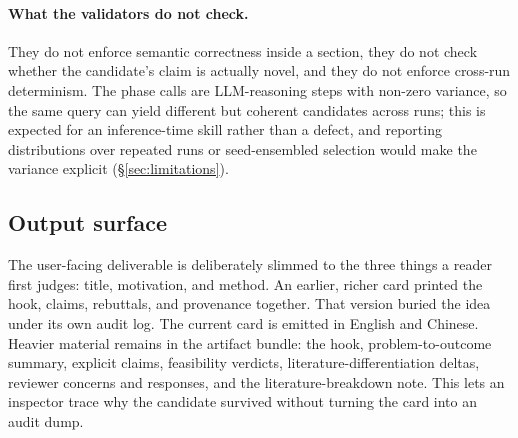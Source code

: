 \documentclass[10pt,a4paper]{article}
\begin{document}
\paragraph{What the validators do not check.} They do not enforce semantic correctness inside a section, they do not check whether the candidate's claim is actually novel, and they do not enforce cross-run determinism. The phase calls are LLM-reasoning steps with non-zero variance, so the same query can yield different but coherent candidates across runs; this is expected for an inference-time skill rather than a defect, and reporting distributions over repeated runs or seed-ensembled selection would make the variance explicit (\S\ref{sec:limitations}).

\subsection{Output surface}
\label{subsec:skill-schema}

The user-facing deliverable is deliberately slimmed to the three things a reader first judges: title, motivation, and method. An earlier, richer card printed the hook, claims, rebuttals, and provenance together. That version buried the idea under its own audit log. The current card is emitted in English and Chinese. Heavier material remains in the artifact bundle: the hook, problem-to-outcome summary, explicit claims, feasibility verdicts, literature-differentiation deltas, reviewer concerns and responses, and the literature-breakdown note. This lets an inspector trace why the candidate survived without turning the card into an audit dump.
\end{document}
